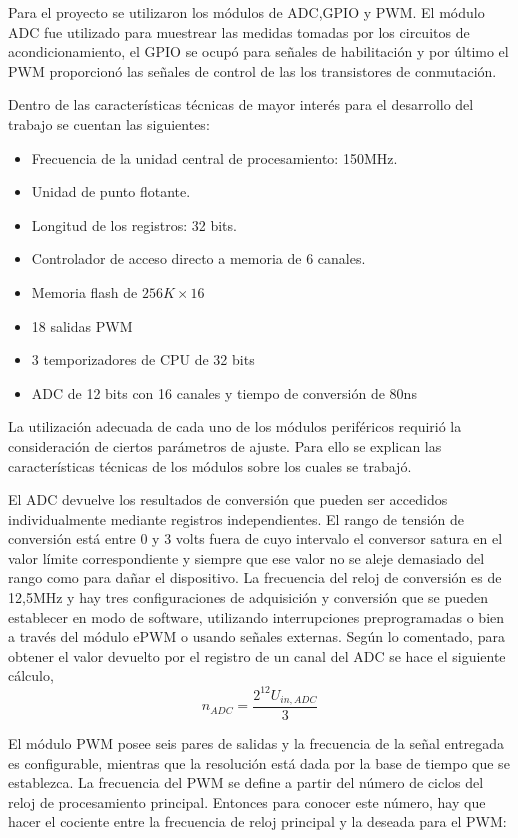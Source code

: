 Para el proyecto se utilizaron los módulos de ADC,GPIO y PWM. El módulo ADC fue utilizado para muestrear las medidas tomadas por los circuitos de acondicionamiento, 
el GPIO se ocupó para señales de habilitación y por último el PWM proporcionó las señales de control de las los transistores de conmutación.

Dentro de las características técnicas de mayor interés para el desarrollo del trabajo se cuentan las siguientes:
\begin{itemize}
 \item Frecuencia de la unidad central de procesamiento: 150MHz.
 \item Unidad de punto flotante.
 \item Longitud de los registros: 32 bits.
 \item Controlador de acceso directo a memoria de 6 canales.
 \item Memoria flash de  $256K \times 16$
 \item 18 salidas PWM
 \item 3 temporizadores de CPU de 32 bits
 \item ADC de 12 bits con 16 canales y tiempo de conversión de 80ns
\end{itemize}

La utilización adecuada de cada uno de los módulos periféricos requirió la consideración de ciertos parámetros de ajuste. Para ello se explican
las características técnicas de los módulos sobre los cuales se trabajó.

El ADC devuelve los resultados de conversión que pueden ser accedidos individualmente mediante registros independientes. El rango
de tensión de conversión está entre 0 y 3 volts fuera de cuyo intervalo el conversor satura en el valor límite correspondiente y siempre que
ese valor no se aleje demasiado del rango como para dañar el dispositivo. La frecuencia del reloj de conversión es de 12,5MHz y hay tres configuraciones
de adquisición y conversión que se pueden establecer en modo de software, utilizando interrupciones preprogramadas o bien
a través del módulo ePWM o usando señales externas. Según lo comentado, para obtener el valor devuelto por el registro de un canal del ADC se hace
el siguiente cálculo,
$$ n_{ADC}=\frac{2^{12}U_{in,ADC}}{3} $$

El módulo PWM posee seis pares de salidas y la frecuencia de la señal entregada es configurable, mientras que la resolución está dada por la base
de tiempo que se establezca. La frecuencia del PWM se define a partir del número de ciclos del reloj de procesamiento principal. Entonces para conocer este
número, hay que hacer el cociente entre la frecuencia de reloj principal y la deseada para el PWM:

